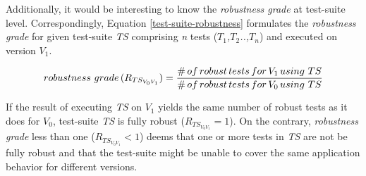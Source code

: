 



Additionally, it would be interesting to know the \textit{
robustness grade} at test-suite level. Correspondingly, Equation \ref{test-suite-robustness} formulates the \textit{
robustness grade} for given test-suite \textit{TS} comprising \textit{n} tests (\textit{$T_1$,$T_2$..,$T_n$}) and executed on version \textit{$V_{1}$}. 

\begin{equation}
robustness \thinspace \thinspace grade \thinspace (R_{TS_{V_{0}V_{1}}}) = \displaystyle \frac{\#\thinspace of \thinspace robust \thinspace tests \thinspace for \thinspace V_{1} \thinspace using \thinspace \thinspace TS}{\# \thinspace of \thinspace robust \thinspace tests \thinspace for  \thinspace V_{0} \thinspace using \thinspace \thinspace TS}\normalsize
\label{test-suite-robustness}
\vspace{0.5cm}
\end{equation}

If the result of executing \textit{TS} on \textit{$V_{1}$} yields the same number of robust tests as it does for \textit{$V_{0}$}, test-suite \textit{TS} is fully robust ($R_{TS_{V_{0}V_{1}}} =1$). On the contrary, \textit{
robustness grade} less than one ($R_{TS_{V_{0}V_{1}}} < 1$) deems that one or more tests in \textit{TS} are not be fully robust and that the test-suite might be unable to cover the same application behavior for different versions. 

